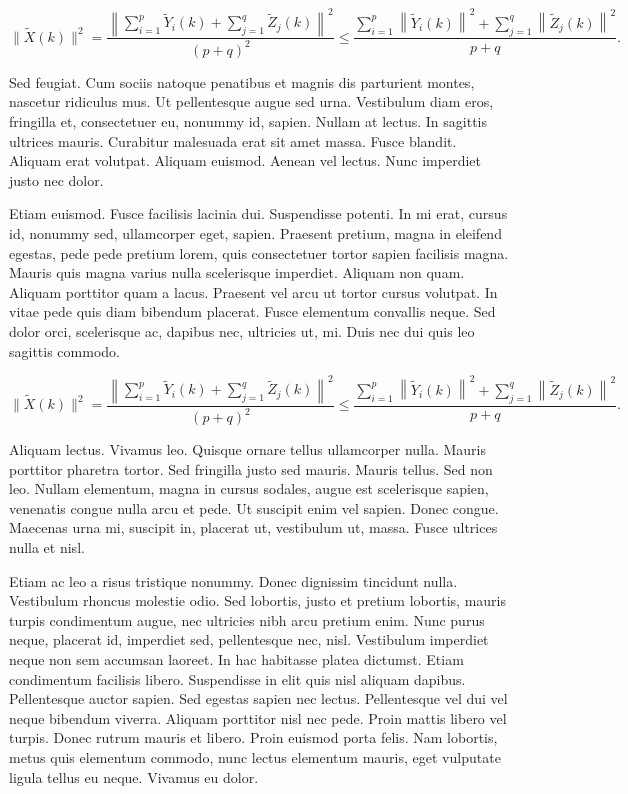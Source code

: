 \documentclass[AMA,STIX1COL]{WileyNJD-SP}
\begin{document}
\begin{equation}\label{eq23}
 \|\tilde{X}(k)\|^2
 =\frac{\left\|\sum\limits_{i=1}^{p}\tilde{Y}_i(k)+\sum\limits_{j=1}^{q}\tilde{Z}_j(k) \right\|^2}{(p+q)^2}
 \leq\frac{\sum\limits_{i=1}^{p}\left\|\tilde{Y}_i(k)\right\|^2+\sum\limits_{j=1}^{q}\left\|\tilde{Z}_j(k)\right\|^2 }{p+q}.
\end{equation}

Sed feugiat. Cum sociis natoque penatibus et magnis dis parturient montes, nascetur ridiculus mus. Ut pellentesque
augue sed urna. Vestibulum diam eros, fringilla et, consectetuer eu, nonummy id, sapien. Nullam at lectus. In sagittis
ultrices mauris. Curabitur malesuada erat sit amet massa. Fusce blandit. Aliquam erat volutpat. Aliquam euismod.
Aenean vel lectus. Nunc imperdiet justo nec dolor.

Etiam euismod. Fusce facilisis lacinia dui. Suspendisse potenti. In mi erat, cursus id, nonummy sed, ullamcorper
eget, sapien. Praesent pretium, magna in eleifend egestas, pede pede pretium lorem, quis consectetuer tortor sapien
facilisis magna. Mauris quis magna varius nulla scelerisque imperdiet. Aliquam non quam. Aliquam porttitor quam
a lacus. Praesent vel arcu ut tortor cursus volutpat. In vitae pede quis diam bibendum placerat. Fusce elementum
convallis neque. Sed dolor orci, scelerisque ac, dapibus nec, ultricies ut, mi. Duis nec dui quis leo sagittis commodo.

\begin{equation}\label{eq24}
 \|\tilde{X}(k)\|^2
 =\frac{\left\|\sum\limits_{i=1}^{p}\tilde{Y}_i(k)+\sum\limits_{j=1}^{q}\tilde{Z}_j(k) \right\|^2}{(p+q)^2}
 \leq\frac{\sum\limits_{i=1}^{p}\left\|\tilde{Y}_i(k)\right\|^2+\sum\limits_{j=1}^{q}\left\|\tilde{Z}_j(k)\right\|^2 }{p+q}.
\end{equation}

Aliquam lectus. Vivamus leo. Quisque ornare tellus ullamcorper nulla. Mauris porttitor pharetra
tortor. Sed fringilla justo sed mauris. Mauris tellus. Sed non leo. Nullam elementum, magna in cursus sodales, augue
est scelerisque sapien, venenatis congue nulla arcu et pede. Ut suscipit enim vel sapien. Donec congue. Maecenas
urna mi, suscipit in, placerat ut, vestibulum ut, massa. Fusce ultrices nulla et nisl.

Etiam ac leo a risus tristique nonummy. Donec dignissim tincidunt nulla. Vestibulum rhoncus molestie odio. Sed
lobortis, justo et pretium lobortis, mauris turpis condimentum augue, nec ultricies nibh arcu pretium enim. Nunc
purus neque, placerat id, imperdiet sed, pellentesque nec, nisl. Vestibulum imperdiet neque non sem accumsan laoreet.
In hac habitasse platea dictumst. Etiam condimentum facilisis libero. Suspendisse in elit quis nisl aliquam dapibus.
Pellentesque auctor sapien. Sed egestas sapien nec lectus. Pellentesque vel dui vel neque bibendum viverra. Aliquam
porttitor nisl nec pede. Proin mattis libero vel turpis. Donec rutrum mauris et libero. Proin euismod porta felis.
Nam lobortis, metus quis elementum commodo, nunc lectus elementum mauris, eget vulputate ligula tellus eu neque.
Vivamus eu dolor.
\end{document}
